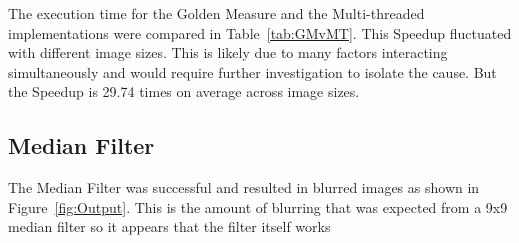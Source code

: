 The execution time for the Golden Measure and the Multi-threaded implementations were compared in Table~\ref{tab:GMvMT}. This Speedup fluctuated with different image sizes. This is likely due to many factors interacting simultaneously and would require further investigation to isolate the cause. But the Speedup is 29.74 times on average across image sizes.


\subsection{Median Filter}

The Median Filter was successful and resulted in blurred images as shown in Figure~\ref{fig:Output}. This is the amount of blurring that was expected from a 9x9 median filter so it appears that the filter itself works





